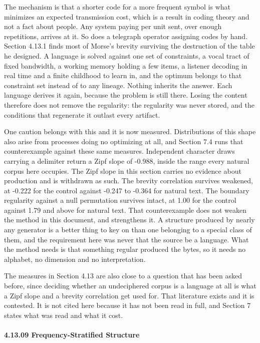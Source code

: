 The mechanism is that a shorter code for a more frequent symbol is what minimizes an expected transmission cost, which is a result in coding theory and not a fact about people. Any system paying per unit sent, over enough repetitions, arrives at it. So does a telegraph operator assigning codes by hand. Section 4.13.1 finds most of Morse's brevity surviving the destruction of the table he designed. A language is solved against one set of constraints, a vocal tract of fixed bandwidth, a working memory holding a few items, a listener decoding in real time and a finite childhood to learn in, and the optimum belongs to that constraint set instead of to any lineage. Nothing inherits the answer. Each language derives it again, because the problem is still there. Losing the content therefore does not remove the regularity: the regularity was never stored, and the conditions that regenerate it outlast every artifact.

One caution belongs with this and it is now measured. Distributions of this shape also arise from processes doing no optimizing at all, and Section 7.4 runs that counterexample against these same measures. Independent character draws carrying a delimiter return a Zipf slope of -0.988, inside the range every natural corpus here occupies. The Zipf slope in this section carries no evidence about production and is withdrawn as such. The brevity correlation survives weakened, at -0.222 for the control against -0.247 to -0.364 for natural text. The boundary regularity against a null permutation survives intact, at 1.00 for the control against 1.79 and above for natural text. That counterexample does not weaken the method in this document, and strengthens it. A structure produced by nearly any generator is a better thing to key on than one belonging to a special class of them, and the requirement here was never that the source be a language. What the method needs is that something regular produced the bytes, so it needs no alphabet, no dimension and no interpretation.

The measures in Section 4.13 are also close to a question that has been asked before, since deciding whether an undeciphered corpus is a language at all is what a Zipf slope and a brevity correlation get used for. That literature exists and it is contested. It is not cited here because it has not been read in full, and Section 7 states what was read and what it cost.

\paragraph{4.13.09 Frequency-Stratified Structure}

